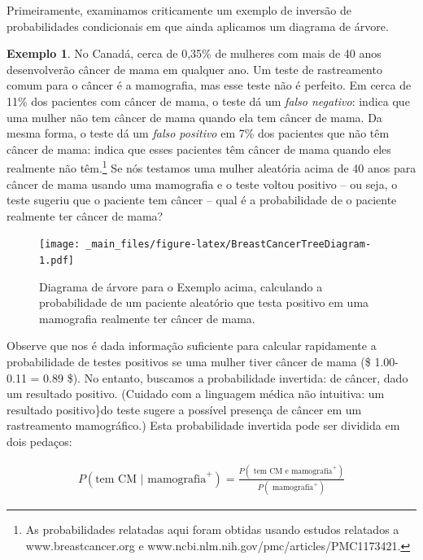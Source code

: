 \documentclass[
]{book}
\theoremstyle{definition}
\theoremstyle{definition}
\newtheorem{example}{Exemplo}[chapter]
\theoremstyle{definition}
\theoremstyle{definition}
\theoremstyle{remark}
\begin{document}
Primeiramente, examinamos criticamente um exemplo de inversão de probabilidades condicionais em que ainda aplicamos um diagrama de árvore.

\begin{example}
\protect\hypertarget{exm:probabilityOfBreastCancerGivenPositiveTestExample}{}{\label{exm:probabilityOfBreastCancerGivenPositiveTestExample} }No Canadá, cerca de 0,35\% de mulheres com mais de 40 anos desenvolverão câncer de mama em qualquer ano. Um teste de rastreamento comum para o câncer é a mamografia, mas esse teste não é perfeito. Em cerca de 11\% dos pacientes com câncer de mama, o teste dá um \emph{falso negativo}: indica que uma mulher não tem câncer de mama quando ela tem câncer de mama. Da mesma forma, o teste dá um \emph{falso positivo} em 7\% dos pacientes que não têm câncer de mama: indica que esses pacientes têm câncer de mama quando eles realmente não têm.\footnote{As probabilidades relatadas aqui foram obtidas usando estudos relatados a www.breastcancer.org e www.ncbi.nlm.nih.gov/pmc/articles/PMC1173421.} Se nós testamos uma mulher aleatória acima de 40 anos para câncer de mama usando uma mamografia e o teste voltou positivo -- ou seja, o teste sugeriu que o paciente tem câncer -- qual é a probabilidade de o paciente realmente ter câncer de mama?
\end{example}

\begin{figure}
\centering
\texttt{[image: \_main\_files/figure-latex/BreastCancerTreeDiagram-1.pdf]}
\caption{\label{fig:BreastCancerTreeDiagram}Diagrama de árvore para o Exemplo acima, calculando a probabilidade de um paciente aleatório que testa positivo em uma mamografia realmente ter câncer de mama.}
\end{figure}

Observe que nos é dada informação suficiente para calcular rapidamente a probabilidade de testes positivos se uma mulher tiver câncer de mama (\$ 1.00-0.11 = 0.89 \$). No entanto, buscamos a probabilidade invertida: de câncer, dado um resultado positivo. (Cuidado com a linguagem médica não intuitiva: um resultado positivo\}do teste sugere a possível presença de câncer em um rastreamento mamográfico.) Esta probabilidade invertida pode ser dividida em dois pedaços:

\begin{align*}
P(\text{tem CM  |  mamografia}^+) = \frac{P(\text{ tem CM e mamografia}^+)}{P(\text{ mamografia}^+)}
\end{align*}
\end{document}
